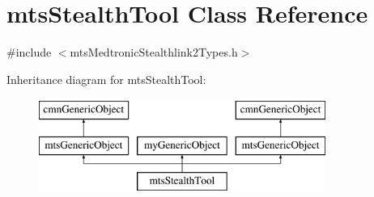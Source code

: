 \hypertarget{classmts_stealth_tool}{\section{mts\-Stealth\-Tool Class Reference}
\label{classmts_stealth_tool}
}


{\ttfamily \#include $<$mts\-Medtronic\-Stealthlink2\-Types.\-h$>$}

Inheritance diagram for mts\-Stealth\-Tool\-:\begin{figure}[H]
\begin{center}
\leavevmode
\includegraphics[height=3.000000cm]{d3/dae/classmts_stealth_tool}
\end{center}
\end{figure}
